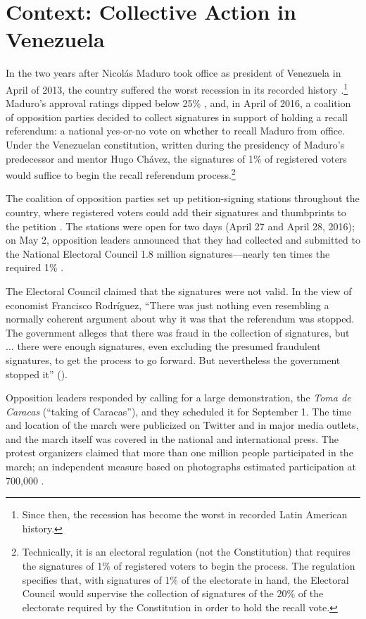 \documentclass[12pt]{article}
\begin{document}
\section{Context: Collective Action in Venezuela}\label{sec:context}

In the two years after Nicol\'{a}s Maduro took office as president of Venezuela in April of 2013, the country suffered the worst recession in its recorded history \citep{kronick2015}.\footnote{Since then, the recession has become the worst in recorded Latin American history.} Maduro's approval ratings dipped below 25\% \citep{datanalisis2016}, and, in April of 2016, a coalition of opposition parties decided to collect signatures in support of holding a recall referendum: a national yes-or-no vote on whether to recall Maduro from office. Under the Venezuelan constitution, written during the presidency of Maduro's predecessor and mentor Hugo Ch\'{a}vez, the signatures of 1\% of registered voters would suffice to begin the recall referendum process.\footnote{Technically, it is an electoral regulation (not the Constitution) that requires the signatures of 1\% of registered voters to begin the process. The regulation specifies that, with signatures of 1\% of the electorate in hand, the Electoral Council would supervise the collection of signatures of the 20\% of the electorate required by the Constitution in order to hold the recall vote.}

The coalition of opposition parties set up petition-signing stations throughout the country, where registered voters could add their signatures and thumbprints to the petition \citep[see][for photos and a description]{PetitionNoticia}. The stations were open for two days (April 27 and April 28, 2016); on May 2, opposition leaders announced that they had collected and submitted to the National Electoral Council 1.8 million signatures---nearly ten times the required 1\% \citep{toro2016}.

The Electoral Council claimed that the signatures were not valid. In the view of economist Francisco Rodr\'{i}guez, ``There was just nothing even resembling a normally coherent argument about why it was that the referendum was stopped. The government alleges that there was fraud in the collection of signatures, but $\ldots$ there were enough signatures, even excluding the presumed fraudulent signatures, to get the process to go forward. But nevertheless the government stopped it'' (\citeyear{frod2017}).

Opposition leaders responded by calling for a large demonstration, the \emph{Toma de Caracas} (``taking of Caracas''), and they scheduled it for September 1. The time and location of the march were publicized on Twitter and in major media outlets, and the march itself was covered in the national and international press. The protest organizers claimed that more than one million people participated in the march; an independent measure based on photographs estimated participation at 700,000 \citep{FRod2016}.
\end{document}
